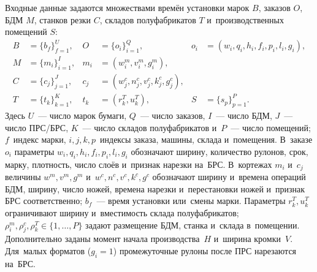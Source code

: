 Входные данные задаются множествами времён установки марок $B$, заказов $O$, БДМ $M$, станков резки $C$, складов полуфабрикатов $T$ и~производственных помещений $S$:
\[
\begin{aligned}
B&=\{b_f\}_{f=1}^{U},&
O&=\{o_i\}_{i=1}^{Q},&
o_i&=(w_i,q_i,h_i,f_i,p_i,l_i,g_i),\\
M&=\{m_i\}_{i=1}^{I},&
m_i&=(w_i^m,v_i^m,g_i^m),\\
C&=\{c_j\}_{j=1}^{J},&
c_j&=(w_j^c,n_j^c,v_j^c,k_j^c,g_j^c),\\
T&=\{t_k\}_{k=1}^{K},&
t_k&=(r_k^T,u_k^T),&
S&=\{s_p\}_{p=1}^{P}.
\end{aligned}
\]
Здесь $U$~--- число марок бумаги, $Q$~--- число заказов, $I$~--- число БДМ, $J$~--- число ПРС/БРС, $K$~--- число складов полуфабрикатов и~$P$~--- число помещений; $f$~индекс марки, $i,j,k,p$~индексы заказа, машины, склада и~помещения. В~заказе $o_i$ параметры $w_i,q_i,h_i,f_i,p_i,l_i,g_i$ обозначают ширину, количество рулонов, срок, марку, плотность, число слоёв и~признак нарезки на~БРС. В~кортежах $m_i$ и~$c_j$ величины $w^m,v^m,g^m$ и~$w^c,n^c,v^c,k^c,g^c$ обозначают ширину и~времена операций БДМ, ширину, число ножей, времена нарезки и~перестановки ножей и~признак БРС соответственно; $b_f$~--- время установки или~смены марки. Параметры $r_k^T,u_k^T$ ограничивают ширину и~вместимость склада полуфабрикатов; $\rho_i^m,\rho_j^c,\rho_k^T\in\{1,\ldots,P\}$ задают размещение БДМ, станка и~склада в~помещении. Дополнительно заданы момент начала производства~$H$ и~ширина кромки~$V$. Для~малых форматов ($g_i=1$) промежуточные рулоны после ПРС нарезаются на~БРС.

